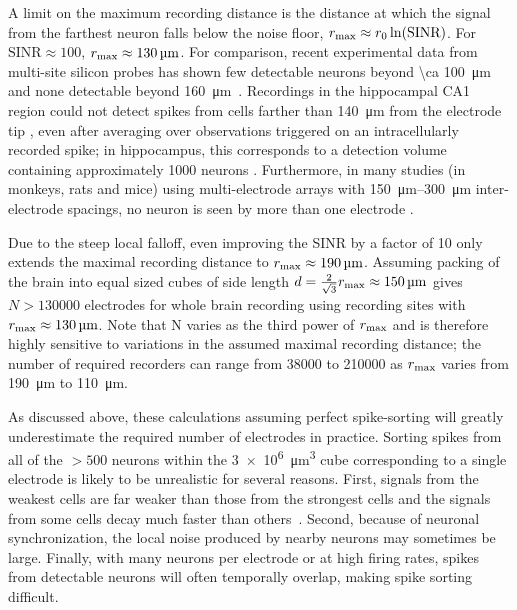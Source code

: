 A limit on the maximum recording distance is the distance at which the signal from the farthest neuron falls below the noise floor, $r_{\text{\scriptsize max}} \approx r_{\text{\scriptsize 0}}\ln(\text{SINR})$. For $\text{SINR} \approx 100$, $r_{\text{\scriptsize max}} \approx \SI{130}{\micro\meter}$. For comparison, recent experimental data from multi-site silicon probes has shown few detectable neurons beyond \SI{\ca 100}{\micro\meter} and none detectable beyond \SI{160}{\micro\meter}~\cite{du11}. 
Recordings in the hippocampal CA1 region could not detect spikes from cells farther than \SI{140}{\micro\meter} from the electrode tip \cite{Henze2000}, even after averaging over observations triggered on an intracellularly recorded spike; in hippocampus, this corresponds to a detection volume containing approximately 1000 neurons \cite{Buzaki2004}. Furthermore, in many studies (in monkeys, rats and mice) using multi-electrode arrays with \SIrange{150}{300}{\micro\meter} inter-electrode spacings, no neuron is seen by more than one electrode \cite{Wessberg2000, Carmena2003, Koralek2012, Jin2010}.

Due to the steep local falloff, even improving the SINR by a factor of 10 only extends the maximal recording distance to $r_{\text{\scriptsize max}} \approx \SI{190}{\micro\meter}$. Assuming packing of the brain into equal sized cubes of side length $d = \frac{2}{\sqrt{3}}r_{\text{\scriptsize max}} \approx \SI{150}{\micro\meter}$ gives $N > 130000$ electrodes for whole brain recording using recording sites with $r_{\text{\scriptsize max}} \approx \SI{130}{\micro\meter}$. Note that N varies as the third power of $r_{\text{\scriptsize max}}$ and is therefore highly sensitive to variations in the assumed maximal recording distance; the number of required recorders can range from \num{38000} to \num{210000} as $r_{\text{\scriptsize max}}$ varies from \SI{190}{\micro\meter} to \SI{110}{\micro\meter}.

As discussed above, these calculations assuming perfect spike-sorting will greatly underestimate the required number of electrodes in practice. Sorting spikes from all of the $> 500$ neurons within the \SI{3e6}{\micro\meter\cubed} cube corresponding to a single electrode is likely to be unrealistic for several reasons.
First, signals from the weakest cells are far weaker than those from the strongest cells and the signals from some cells decay much faster than others~\cite{gray95}.
Second, because of neuronal synchronization, the local noise produced by nearby neurons may sometimes be large. 
Finally, with many neurons per electrode or at high firing rates, spikes from detectable neurons will often temporally overlap, making spike sorting difficult.

